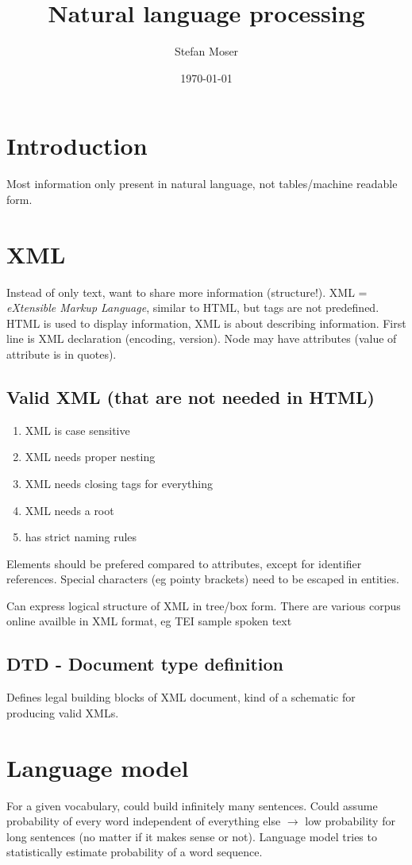\documentclass[11pt]{article}
\title{\textbf{Natural language processing}}
\author{Stefan Moser}
\date{\today}
\begin{document}
\maketitle
\section{Introduction}
Most information only present in natural language, not tables/machine readable form. 

\section{XML}
Instead of only text, want to share more information (structure!). 
XML = \emph{eXtensible Markup Language}, similar
to HTML, but tags are not predefined. HTML is used to display information, XML is about describing
information. First line is XML declaration (encoding, version). Node may have attributes (value of attribute
is in quotes). 
\subsection{Valid XML (that are not needed in HTML)}
\begin{enumerate}
	\item XML is case sensitive
	\item XML needs proper nesting
	\item XML needs closing tags for everything
	\item XML needs a root
	\item has strict naming rules
\end{enumerate}
Elements should be prefered compared to attributes, except for identifier references. Special characters
(eg pointy brackets) need to be escaped in entities.

Can express logical structure of XML in tree/box form. 
There are various corpus online availble in XML format, eg TEI sample spoken text
\subsection{DTD - Document type definition}
Defines legal building blocks of XML document, kind of a schematic for producing valid XMLs.

\section{Language model}
For a given vocabulary, could build infinitely many sentences. Could assume probability of every word
independent of everything else $\rightarrow$ low probability for long sentences (no matter if it makes
sense or not). Language model tries to statistically estimate probability of a word sequence.
\end{document}
